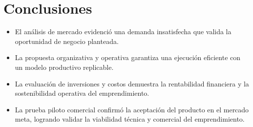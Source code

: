 \section*{Conclusiones}

\begin{itemize}
    \item El análisis de mercado evidenció una demanda insatisfecha que valida la oportunidad de negocio planteada.
    \item La propuesta organizativa y operativa garantiza una ejecución eficiente con un modelo productivo replicable.
    \item La evaluación de inversiones y costos demuestra la rentabilidad financiera y la sostenibilidad operativa del emprendimiento.
    \item La prueba piloto comercial confirmó la aceptación del producto en el mercado meta, logrando validar la viabilidad técnica y comercial del emprendimiento.
\end{itemize}
